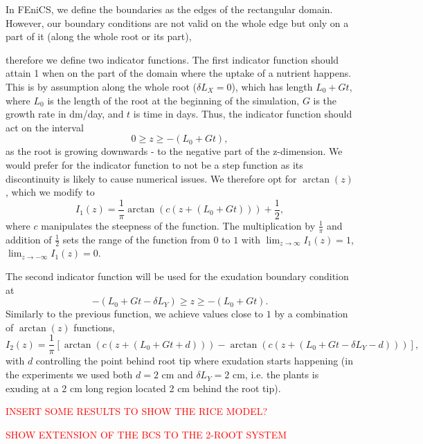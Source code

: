 \documentclass[11pt]{article}
\begin{document}
In FEniCS, we define the boundaries as the edges of the rectangular domain. However, our boundary conditions are not valid on the whole edge but only on a part of it (along the whole root or its part), 

therefore we define two indicator functions. The first indicator function should attain 1 when on the part of the domain where the uptake of a nutrient happens. This is by assumption along the whole root ($\delta L_X =0$), which has length $L_0 + Gt$, where $L_0$ is the length of the root at the beginning of the simulation, $G$ is the growth rate in dm/day, and $t$ is time in days. Thus, the indicator function should act on the interval $$0 \geq z \geq -(L_0 + Gt),$$ as the root is growing downwards - to the negative part of the z-dimension. We would prefer for the indicator function to not be a step function as its discontinuity is likely to cause numerical issues. We therefore opt for $\arctan(z)$, which we modify to 
\begin{equation}
    I_1 (z) = \frac{1}{\pi} \arctan(c (z+(L_0 + Gt))) + \frac{1}{2},
\end{equation}
where $c$ manipulates the steepness of the function. The multiplication by $\frac{1}{\pi}$ and addition of $\frac{1}{2}$ sets the range of the function from $0$ to $1$ with $\lim_{z \to \infty} I_1(z) = 1$, $\lim_{z \to -\infty} I_1(z) = 0$.

The second indicator function will be used for the exudation boundary condition at $$-(L_0 + Gt - \delta L_Y) \geq z \geq -(L_0 + Gt).$$ Similarly to the previous function, we achieve values close to $1$ by a combination of $\arctan(z)$ functions,
\begin{equation}
    I_2 (z) = \frac{1}{\pi} [ \arctan(c (z+(L_0 + Gt + d))) - \arctan(c (z+(L_0 + Gt -\delta L_Y - d))) ],
\end{equation}
with $d$ controlling the point behind root tip where exudation starts happening (in the experiments we used both $d = 2$ cm and $\delta L_Y = 2$ cm, i.e. the plants is exuding at a 2 cm long region located 2 cm behind the root tip).

\textcolor{red}{INSERT SOME RESULTS TO SHOW THE RICE MODEL?}

\textcolor{red}{SHOW EXTENSION OF THE BCS TO THE 2-ROOT SYSTEM}
\end{document}
